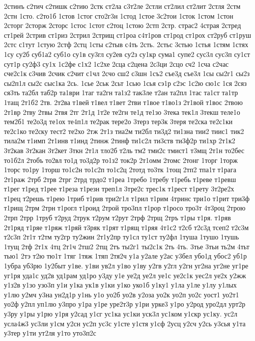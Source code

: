 {2стинъ
с2тич
с2тишк
с2тию
2стк
ст2ла
с3т2ле
2стли
ст2лил
ст2лит
2стля
2стм
2стн
1сто.
с2то1б
1стов
1стог
сто2г3н
1стод
1стое
3с2тои
1сток
1стом
1стон
2сторг
2сторж
2сторс
1стос
1стот
с2тоц
1стою
2стп
2стр.
страс2
4страя
2стред
ст1рей
2стрив
ст1риз
2стрил
2стрищ
ст1роа
с4т1ров
ст1род
ст1рох
ст2руб
ст1руш
2стс
с1тут
1стую
2стф
2стц
1сты
с2тыв
с4ть
2сть.
2стьс
3стью
1стья
1стям
1стях
1су
су2б
суб1а2
суб1о
су1в
су3гл
су2ев
су2з
су1кр
сума1
супе2
сус3л
сус3п
су1ст
сут1р
су2ф3
су1х
1с2фе
с1х2
1с2хе
2сца
с2цена
2с3ци
2сцо
сч2
1сча
с2час
сче2с1к
с3чив
2счик
с2чит
с1чл
2счо
сш2
с3шн
1съ2
съе3д
съе3л
1сы
сы2г1
сы2з
сы2п1л
сы2с
сыс1ка
2сь.
1сье
2ськ
2сьт
1сью
1сья
сэ1р
с2эс
1с2ю
сю1с
1ся
2сяз
ся3ть
та2бл
таб2р
та1ври
1таг
та2гн
та1з2
так3ле
т2ан
та2пл
1тас
та1ст
та1тр
1тащ
2т1б2
2тв.
2т2ва
т1вей
т1вел
т1вет
2тви
т1вое
т1во1з
2т1вой
т1вос
2твою
2т1вр
2тву
2твы
2твя
2тг
2т1д
1т2е
те2гн
те1д
те1зо
3тека
тек1л
3текш
теле1о
тем2б1
те2о3д
те1ох
те4п1л
те2рак
тере2о
3терз
тер3к
3теря
те2ска
те2с1ки
те2с1ко
те2ску
тест2
те2хо
2тж
2т1з
тиа2м
ти2бл
ти3д2
ти1зна
тии2
тиис1
тик2
тила2м
т1имп
2т1инв
т1инд
2тинж
2тинф
ти1с2л
ти3ств
ти3ф2р
ти1хр
2т1к2
3т2кав
3т2кан
3т2кет
3ткн
2т1л
тло2б
т2ль
тм2
тми2с
тмист1
т3мщ
2т1н
то2бес
то1б2л
2тобъ
то2вл
то1д
то3д2р
то1з2
ток2р
2т1омм
2томс
2тонг
1торг
1торж
1торс
то1ру
1торш
то1с2н
то1с2п
то1с2ц
2тотд
то3тк
1тощ
2тп2
тпа1т
т1рага
2т1раж
2трб
2трв
2трг
2трд
трдо2
т1реа
1требо
1требу
т1ребь
т1реве
т1ревш
т1рег
т1ред
т1рее
т1реза
т1резн
треп1л
3тре2с
трес1к
т1рест
т1рету
3т2ре2х
т1рец
т2решь
т1рею
1триб
т1рив
три2г1л
т1рил
т1рим
4тринс
три1о
т1рит
три3ф
т1рищ
2трм
2трн
т1рогл
т1роид
2трой
тро3пл
т1рор
т1росо
тро3т
4т3роц
2трою
2трп
2трр
1труб
т2руд
2трук
т2рум
т2рут
2трф
2трщ
2тръ
т1ры
т1ря.
т1ряв
2т1ряд
т1ряе
т1ряж
т1ряй
т3ряк
т1рят
т1рящ
т1ряя
4т1с2
т2сб
т2с3д
тсеп2
т2с3м
т2с3п
2т1т
т2тм
ту2гр
ту2жин
2т1у2пр
ту1сл
ту1ст
ту2фл
1туша
1тушо
1тушь
1тущ
2тф
2т1х
4тц
2т1ч
2тш2
2тщ
2тъ
ты2г1
ты2с1к
2ть
4ть.
3тье
3тьи
ть2м
4тьт
тью1
2тэ
т2ю
тю1т
1тяг
1тяж
1тяп
2тя2ч
у1а
у2але
у2ас
у3бел
убо1д
убос2
уб1р
1убра
уб3рю
1у2быт
у1ве.
у1ви
ув2л
у1во
у1ву
у2гв
у2гл
у2гн
уг2на
уг2не
уг1ре
уг1ря
уда1с
уд2в
уд1рам
уд1ро
у3ду
у1е
уе2д
уе2л
уе1с
уе2с1к
уес2л
уе2х
у2жж
у1з2в
у1зо
узо3п
у1и
у1ка
ук1в
у1ки
у1ко
уко1б
у1ку1
у1ла
у1ле
у1лу
у1лых
у1лю
у2мч
у3на
ун2д1р
у1нь
у1о
уо2б
уо2в
у2оза
уо2к
уо2п
уо2с
уост1
уо2т1
уо2ф
у2пл
уп1лю
у3про
у1ра
у1ре
уре2т3р
у1ри
урке3
у1ро
у2род
уро2дл
урт2р
у3ру
у1ры
у1рю
у1ря
у2сад
у1сг
ус1ка
ус1ки
уск3л
ус1ком
у1скр
ус1ку.
ус2л
усла4ж3
ус3ли
у1см
у2сн
ус2п
ус3с
у1сте
у1стя
у1сф
2усц
у2сч
у2сь
у3сья
у1та
у3тер
у1ти
ут2ля
у1то
уто3п2с
}
